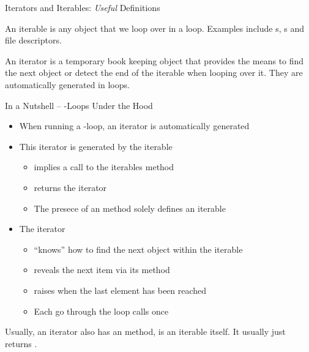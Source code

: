 
\begin{frame}[fragile]{Iterators and Iterables: \emph{Useful} Definitions}
%
\begin{defbox}[Iterable]
An iterable is any object that we loop over in a  loop. Examples include s, s and file descriptors.
\end{defbox}
%
\begin{defbox}[Iterator]
An iterator is a temporary book keeping object that provides the means to find the next object or detect the end of the iterable when looping over it.
They are automatically generated in  loops.
\end{defbox}
%
\end{frame}


\begin{frame}[fragile]{In a Nutshell -- -Loops Under the Hood}
%
\begin{itemize}
\item When running a -loop, an iterator is automatically generated
\item This iterator is generated by the iterable
	\begin{itemize}
	\item {} implies a call to the iterables  method
	\item {} returns the iterator
	\item The presece of an  method solely defines an iterable
	\end{itemize}
\item The iterator
	\begin{itemize}
	\item \enquote{knows} how to find the next object within the iterable
	\item reveals the next item via its  method
	\item raises  when the last element has been reached
	\item Each go through the loop calls  once
	\end{itemize}
\end{itemize}
%
\begin{hintbox}
\footnotesize
Usually, an iterator also has an  method, \ie is an iterable itself. It usually just returns .
\end{hintbox}
%
\end{frame}

